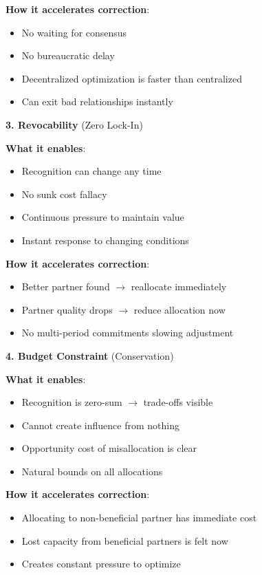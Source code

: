 \documentclass[11pt,a4paper]{article}
\theoremstyle{definition}
\theoremstyle{remark}
\begin{document}
\textbf{How it accelerates correction}:
\begin{itemize}
\item No waiting for consensus
\item No bureaucratic delay
\item Decentralized optimization is faster than centralized
\item Can exit bad relationships instantly
\end{itemize}

\textbf{3. Revocability} (Zero Lock-In)

\textbf{What it enables}:
\begin{itemize}
\item Recognition can change any time
\item No sunk cost fallacy
\item Continuous pressure to maintain value
\item Instant response to changing conditions
\end{itemize}

\textbf{How it accelerates correction}:
\begin{itemize}
\item Better partner found $\rightarrow$ reallocate immediately
\item Partner quality drops $\rightarrow$ reduce allocation now
\item No multi-period commitments slowing adjustment
\end{itemize}

\textbf{4. Budget Constraint} (Conservation)

\textbf{What it enables}:
\begin{itemize}
\item Recognition is zero-sum $\rightarrow$ trade-offs visible
\item Cannot create influence from nothing
\item Opportunity cost of misallocation is clear
\item Natural bounds on all allocations
\end{itemize}

\textbf{How it accelerates correction}:
\begin{itemize}
\item Allocating to non-beneficial partner has immediate cost
\item Lost capacity from beneficial partners is felt now
\item Creates constant pressure to optimize
\end{itemize}
\end{document}
